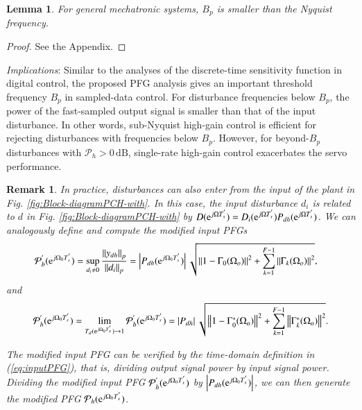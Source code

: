 \documentclass [11pt, proquest] {uwthesis}[2020/02/24]
\newtheorem{lemma}{Lemma}
\newtheorem{remark}{Remark}
\begin{document}
\begin{lemma}\label{For-general-mechatronic}For general mechatronic
systems, $B_{p}$ is smaller than the Nyquist frequency.\end{lemma} 
\begin{proof}
See the Appendix.
\end{proof}
\emph{Implications}: Similar to the analyses of the discrete-time
sensitivity function in digital control, the proposed PFG analysis
gives an important threshold frequency $B_{p}$ in sampled-data control.
For disturbance frequencies below $B_{p}$, the power of the fast-sampled
output signal is smaller than that of the input disturbance. In other
words, sub-Nyquist high-gain control is efficient for rejecting disturbances
with frequencies below $B_{p}$. However, for beyond-$B_{p}$ disturbances
with $\mathcal{P}_{h}>0\,\text{dB}$, single-rate high-gain control
exacerbates the servo performance. 

\begin{remark}\label{In-practice,-disturbances}In practice, disturbances
can also enter from the input of the plant in Fig. \ref{fig:Block-diagramPCH-with}.
In this case, the input disturbance $d_{i}$ is related to $d$ in
Fig. \ref{fig:Block-diagramPCH-with} by $D(\mathrm{e}^{j\Omega T_{s}^{'}})=D_{i}(\mathrm{e}^{j\Omega T_{s}^{'}})P_{dh}(\mathrm{e}^{j\Omega T_{s}^{'}})$.
We can analogously define and compute the modified input PFGs
\begin{align}
\mathcal{P}_{b}^{'}(\mathrm{e}^{j\Omega_{0}T_{s}^{'}}) & =\sup_{d_{i}\neq0}\frac{\left\Vert y_{dh}\right\Vert _{p}}{\left\Vert d_{i}\right\Vert _{p}}=\left|P_{dh}(\mathrm{e}^{j\Omega_{0}T_{s}^{'}})\right|\sqrt{\left\Vert 1-\Gamma_{0}(\Omega_{o})\right\Vert ^{2}+\sum_{k=1}^{F-1}\left\Vert \Gamma_{k}(\Omega_{o})\right\Vert ^{2}},\label{eq:inputPFG}
\end{align}
and
\begin{align}
\mathcal{P}_{h}^{'}(\mathrm{e}^{j\Omega_{0}T_{s}^{'}})=\lim_{T_{d}(\mathrm{e}^{j\Omega_{0}T_{s}^{'}})\rightarrow1}\mathcal{P}_{b}^{'}(\mathrm{e}^{j\Omega_{0}T_{s}^{'}})=\left|P_{dh}\right|\sqrt{\left\Vert 1-\Gamma_{0}^{*}(\Omega_{o})\right\Vert ^{2}+\sum_{k=1}^{F-1}\left\Vert \Gamma_{k}^{*}(\Omega_{o})\right\Vert ^{2}}.\label{eq:PFR DOB-1-1}
\end{align}

The modified input PFG can be verified by the time-domain definition
in (\ref{eq:inputPFG}), that is, dividing output signal power by
input signal power. Dividing the modified input PFG $\mathcal{P}_{h}^{'}(\mathrm{e}^{j\Omega_{0}T_{s}^{'}})$
by $\left|P_{dh}(\mathrm{e}^{j\Omega_{0}T_{s}^{'}})\right|$, we can then
generate the modified PFG $\mathcal{P}_{h}(\mathrm{e}^{j\Omega_{0}T_{s}^{'}})$.
\end{remark}
\end{document}
